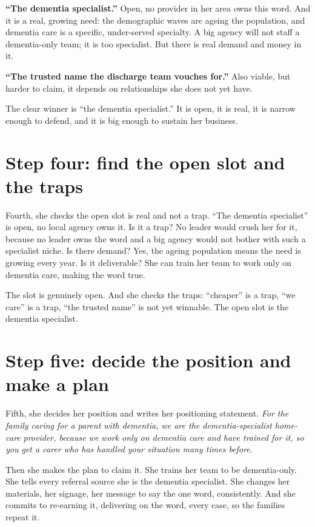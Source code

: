 \documentclass[10pt,twoside,openany]{memoir}
\newcommand{\needspacehead}{\needspace{4\baselineskip}}
\let\oldsection\section
\renewcommand{\section}{\needspacehead\oldsection}
\begin{document}
\textbf{``The dementia specialist.''} Open, no provider in her area owns
this word. And it is a real, growing need: the demographic waves are
ageing the population, and dementia care is a specific, under-served
specialty. A big agency will not staff a dementia-only team; it is too
specialist. But there is real demand and money in it.

\textbf{``The trusted name the discharge team vouches for.''} Also
viable, but harder to claim, it depends on relationships she does not
yet have.

The clear winner is ``the dementia specialist.'' It is open, it is real,
it is narrow enough to defend, and it is big enough to sustain her
business.

\section{Step four: find the open slot and the
traps}\label{step-four-find-the-open-slot-and-the-traps}

Fourth, she checks the open slot is real and not a trap. ``The dementia
specialist'' is open, no local agency owns it. Is it a trap? No leader
would crush her for it, because no leader owns the word and a big agency
would not bother with such a specialist niche. Is there demand? Yes, the
ageing population means the need is growing every year. Is it
deliverable? She can train her team to work only on dementia care,
making the word true.

The slot is genuinely open. And she checks the traps: ``cheaper'' is a
trap, ``we care'' is a trap, ``the trusted name'' is not yet winnable.
The open slot is the dementia specialist.

\section{Step five: decide the position and make a
plan}\label{step-five-decide-the-position-and-make-a-plan}

Fifth, she decides her position and writes her positioning statement.
\emph{For the family caring for a parent with dementia, we are the
dementia-specialist home-care provider, because we work only on dementia
care and have trained for it, so you get a carer who has handled your
situation many times before.}

Then she makes the plan to claim it. She trains her team to be
dementia-only. She tells every referral source she is the dementia
specialist. She changes her materials, her signage, her message to say
the one word, consistently. And she commits to re-earning it, delivering
on the word, every case, so the families repeat it.
\end{document}
